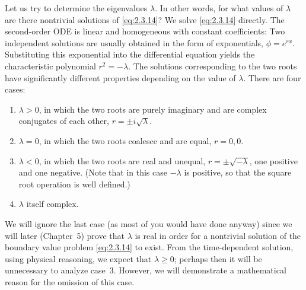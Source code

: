 Let us try to determine the eigenvalues $\lambda$. In other words, for what values of $\lambda$ are there nontrivial solutions of \eqref{eq:2.3.14}? We solve \eqref{eq:2.3.14} directly. The second-order ODE is linear and homogeneous with constant coefficients: Two independent solutions are usually obtained in the form of exponentials, $\phi = e^{rx}$. Substituting this exponential into the differential equation yields the characteristic polynomial $r^2 = -\lambda$. The solutions corresponding to the two roots have significantly different properties depending on the value of $\lambda$. There are four cases:
\begin{enumerate}
\item $\lambda > 0$, in which the two roots are purely imaginary and are complex conjugates of each other, $r = \pm i\sqrt{\lambda}$.
\item $\lambda = 0$, in which the two roots coalesce and are equal, $r = 0, 0$.
\item $\lambda < 0$, in which the two roots are real and unequal, $r = \pm\sqrt{-\lambda}$, one positive and one negative. (Note that in this case $-\lambda$ is positive, so that the square root operation is well defined.)
\item $\lambda$ itself complex.
\end{enumerate}

We will ignore the last case (as most of you would have done anyway) since we will later (Chapter~5) prove that $\lambda$ is real in order for a nontrivial solution of the boundary value problem \eqref{eq:2.3.14} to exist. From the time-dependent solution, using physical reasoning, we expect that $\lambda \ge 0$; perhaps then it will be unnecessary to analyze case~3. However, we will demonstrate a mathematical reason for the omission of this case.

